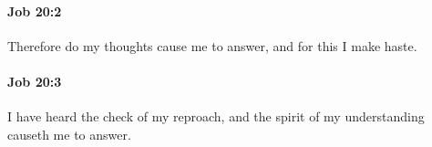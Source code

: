 		\paragraph{Job 20:2} %
			\label{JOB-20-2}

			Therefore do my thoughts cause me to answer, and for this I make haste.


		\paragraph{Job 20:3} %
			\label{JOB-20-3}

			I have heard the check of my reproach, and the spirit of my understanding causeth me to answer.


